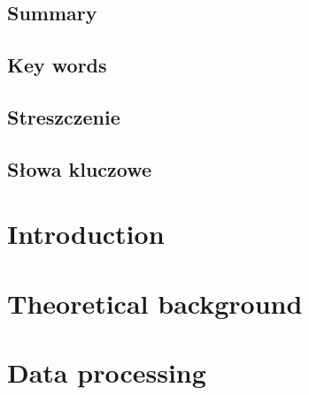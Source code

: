 \documentclass[12pt]{report}
\begin{document}
    
    \pagestyle{empty}
    \section*{Summary}
    \section*{Key words}
    \newpage
    \pagestyle{empty}
    \section*{Streszczenie}
    \section*{Słowa kluczowe}
    
    
    \tableofcontents
    
    
    \pagestyle{fancy}
    \chapter{Introduction} \label{ch:introduction} %
    
    \chapter{Theoretical background}
    
    \chapter{Data processing}
    


\end{document}
